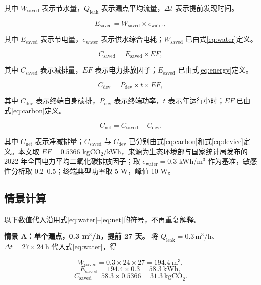 \documentclass[UTF8,11pt,a4paper,fontset=none]{ctexart}
\begin{document}
其中 \(W_{\text{saved}}\) 表示节水量，\(Q_{\text{leak}}\) 表示漏点平均流量，\(\Delta t\) 表示提前发现时间。

\begin{equation}
  E_{\text{saved}} = W_{\text{saved}} \times e_{\text{water}},
  \label{eq:energy}
\end{equation}

其中 \(E_{\text{saved}}\) 表示节电量，\(e_{\text{water}}\) 表示供水综合电耗；\(W_{\text{saved}}\) 已由式\eqref{eq:water}定义。

\begin{equation}
  C_{\text{saved}} = E_{\text{saved}} \times EF,
  \label{eq:carbon}
\end{equation}

其中 \(C_{\text{saved}}\) 表示减排量，\(EF\) 表示电力排放因子；\(E_{\text{saved}}\) 已由式\eqref{eq:energy}定义。

\begin{equation}
  C_{\text{dev}} = P_{\text{dev}} \times t \times EF,
  \label{eq:device}
\end{equation}

其中 \(C_{\text{dev}}\) 表示终端自身碳排，\(P_{\text{dev}}\) 表示终端功率，\(t\) 表示年运行小时；\(EF\) 已由式\eqref{eq:carbon}定义。

\begin{equation}
  C_{\text{net}} = C_{\text{saved}} - C_{\text{dev}}.
  \label{eq:net}
\end{equation}

其中 \(C_{\text{net}}\) 表示净减排量；\(C_{\text{saved}}\) 与 \(C_{\text{dev}}\) 已分别由式\eqref{eq:carbon}和式\eqref{eq:device}定义。本文取 \(EF=0.5366\) kgCO\(_2\)/kWh，来源为生态环境部与国家统计局发布的 2022 年全国电力平均二氧化碳排放因子\cite{mee}；取 \(e_{\text{water}}=0.3\) kWh/m\(^3\) 作为基准，敏感性分析取 0.2--0.5；终端典型功率取 5 W，峰值 10 W。

\subsection{情景计算}

以下数值代入沿用式\eqref{eq:water}--\eqref{eq:net}的符号，不再重复解释。

\textbf{情景 A：单个漏点，0.3 m\(^3\)/h，提前 27 天。} 将 \(Q_{\text{leak}}=0.3\ \text{m}^3/\text{h}\)、\(\Delta t=27\times24\ \text{h}\) 代入式\eqref{eq:water}，得

\begin{equation}
  W_{\text{saved}} = 0.3 \times 24 \times 27 = 194.4\ \text{m}^3,
\end{equation}
\begin{equation}
  E_{\text{saved}} = 194.4 \times 0.3 = 58.3\ \text{kWh},
\end{equation}
\begin{equation}
  C_{\text{saved}} = 58.3 \times 0.5366 = 31.3\ \text{kgCO}_2.
\end{equation}
\end{document}
